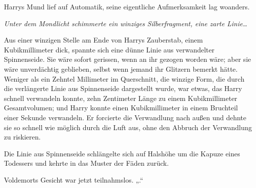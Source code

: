 Harrys Mund lief auf Automatik, seine eigentliche Aufmerksamkeit lag woanders.

\emph{Unter dem Mondlicht schimmerte ein winziges Silberfragment, eine zarte Linie…}

Aus einer winzigen Stelle am Ende von Harrys Zauberstab, einem Kubikmillimeter dick, spannte sich eine dünne Linie aus verwandelter Spinnenseide. Sie wäre sofort gerissen, wenn an ihr gezogen worden wäre; aber sie wäre unverdächtig geblieben, selbst wenn jemand ihr Glitzern bemerkt hätte. Weniger als ein Zehntel Millimeter im Querschnitt, die winzige Form, die durch die verlängerte Linie aus Spinnenseide dargestellt wurde, war etwas, das Harry schnell verwandeln konnte, zehn Zentimeter Länge zu einem Kubikmillimeter Gesamtvolumen; und Harry konnte einen Kubikmillimeter in einem Bruchteil einer Sekunde verwandeln. Er forcierte die Verwandlung nach außen und dehnte sie so schnell wie möglich durch die Luft aus, ohne den Abbruch der Verwandlung zu riskieren.

Die Linie aus Spinnenseide schlängelte sich auf Halshöhe um die Kapuze eines Todessers und kehrte in das Muster der Fäden zurück.

Voldemorts Gesicht war jetzt teilnahmslos.
„.“

